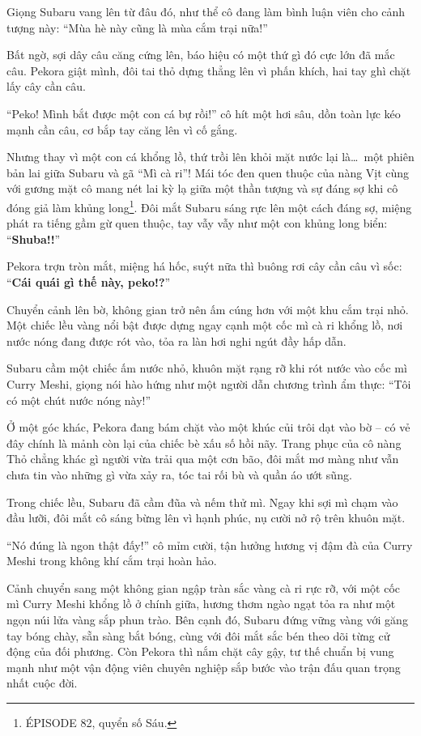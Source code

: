 \documentclass[../main.tex]{subfiles}
\begin{document}
Giọng Subaru vang lên từ đâu đó, như thể cô đang làm bình luận viên cho cảnh tượng này: ``Mùa hè này cũng là mùa cắm trại nữa!''

Bất ngờ, sợi dây câu căng cứng lên, báo hiệu có một thứ gì đó cực lớn đã mắc câu. Pekora giật mình, đôi tai thỏ dựng thẳng lên vì phấn khích, hai tay ghì chặt lấy cây cần câu.

``Peko! Mình bắt được một con cá bự rồi!'' cô hít một hơi sâu, dồn toàn lực kéo mạnh cần câu, cơ bắp tay căng lên vì cố gắng.

Nhưng thay vì một con cá khổng lồ, thứ trồi lên khỏi mặt nước lại là\dots\ một phiên bản lai giữa Subaru và gã ``Mì cà ri''! Mái tóc đen quen thuộc của nàng Vịt cùng với gương mặt cô mang nét lai kỳ lạ giữa một thần tượng và sự đáng sợ khi cô đóng giả làm khủng long\footnote{{\flaregothic ÉPISODE 82}, quyển số Sáu.}. Đôi mắt Subaru sáng rực lên một cách đáng sợ, miệng phát ra tiếng gầm gừ quen thuộc, tay vẫy vẫy như một con khủng long biển: ``\textbf{Shuba!!}''

Pekora trợn tròn mắt, miệng há hốc, suýt nữa thì buông rơi cây cần câu vì sốc: ``\textbf{Cái quái gì thế này, peko!?}''


Chuyển cảnh lên bờ, không gian trở nên ấm cúng hơn với một khu cắm trại nhỏ. Một chiếc lều vàng nổi bật được dựng ngay cạnh một cốc mì cà ri khổng lồ, nơi nước nóng đang được rót vào, tỏa ra làn hơi nghi ngút đầy hấp dẫn.

Subaru cầm một chiếc ấm nước nhỏ, khuôn mặt rạng rỡ khi rót nước vào cốc mì Curry Meshi, giọng nói hào hứng như một người dẫn chương trình ẩm thực: ``Tôi có một chút nước nóng này!''

Ở một góc khác, Pekora đang bám chặt vào một khúc củi trôi dạt vào bờ – có vẻ đây chính là mảnh còn lại của chiếc bè xấu số hồi nãy. Trang phục của cô nàng Thỏ chẳng khác gì người vừa trải qua một cơn bão, đôi mắt mơ màng như vẫn chưa tin vào những gì vừa xảy ra, tóc tai rối bù và quần áo ướt sũng.

Trong chiếc lều, Subaru đã cầm đũa và nếm thử mì. Ngay khi sợi mì chạm vào đầu lưỡi, đôi mắt cô sáng bừng lên vì hạnh phúc, nụ cười nở rộ trên khuôn mặt.

``Nó đúng là ngon thật đấy!'' cô mỉm cười, tận hưởng hương vị đậm đà của Curry Meshi trong không khí cắm trại hoàn hảo.


Cảnh chuyển sang một không gian ngập tràn sắc vàng cà ri rực rỡ, với một cốc mì Curry Meshi khổng lồ ở chính giữa, hương thơm ngào ngạt tỏa ra như một ngọn núi lửa vàng sắp phun trào. Bên cạnh đó, Subaru đứng vững vàng với găng tay bóng chày, sẵn sàng bắt bóng, cùng với đôi mắt sắc bén theo dõi từng cử động của đối phương. Còn Pekora thì nắm chặt cây gậy, tư thế chuẩn bị vung mạnh như một vận động viên chuyên nghiệp sắp bước vào trận đấu quan trọng nhất cuộc đời.
\end{document}
